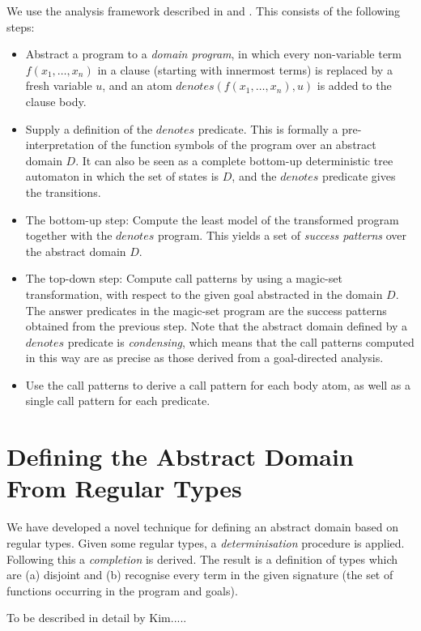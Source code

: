 \documentclass[11pt]{article}
\begin{document}
We use the analysis framework described in \cite{Gallagher-Boulanger-Saglam-ILPS95}
and \cite{Codish-Demoen}.  
This consists of the following steps:
\begin{itemize}
\item
Abstract a program to a {\em domain program}, in which every non-variable
term $f(x_1,\ldots,x_n)$ in a clause  (starting with innermost terms)
is replaced by a fresh variable $u$, and an atom
$denotes(f(x_1,\ldots,x_n),u)$ is added to the clause body. 
\item
Supply a definition of the $denotes$ predicate.  This is formally a
pre-interpretation of the function symbols of the program over an abstract
domain $D$.  It can also be seen as a complete bottom-up deterministic
tree automaton in which the set of states is $D$, and the $denotes$ predicate
gives the transitions.
\item
The bottom-up step: Compute the least model of the transformed program together with
the $denotes$ program.  This yields a set of {\em success patterns}
over the abstract domain $D$.
\item
The top-down step: Compute call patterns by using a magic-set transformation,
with
respect to the given goal abstracted in the domain $D$.  The answer
predicates in the magic-set program are the success patterns obtained
from the previous step.  Note that the abstract domain defined by
a $denotes$ predicate is {\em condensing}, which means that the
call patterns computed in this way are as precise as those derived from
a goal-directed analysis.
\item
Use the call patterns to derive a call pattern for each body atom, as
well as a single call pattern for each predicate.
\end{itemize}

\section{Defining the Abstract Domain From Regular Types}

We have developed a novel technique for defining an abstract domain
based on regular types. 
Given some regular types, a {\em determinisation} procedure is applied.
Following this a {\em completion} is derived.  The result is a definition
of types which are (a) disjoint and (b) recognise every term in the
given signature (the set of functions occurring in the program
and goals).

To be described in detail by Kim.....
\end{document}

